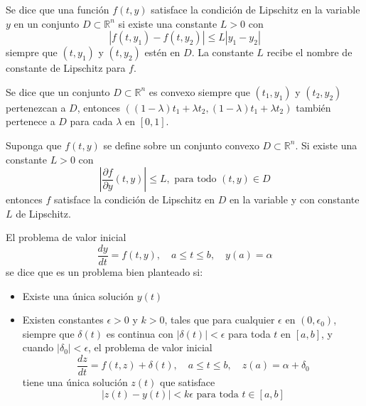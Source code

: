 \begin{definition}
    Se dice que una función $f(t,y)$  satisface la condición de Lipschitz en la variable $y$ en un conjunto $D \subset \mathbb{R}^n$ si existe una constante $L > 0$ con
    \[ |f(t, y_1) - f(t, y_2)| \leq L |y_1 - y_2| \]
    siempre que $(t, y_1)$ y $(t, y_2)$ estén en $D$. La constante $L$ recibe el nombre de constante de Lipschitz para $f$.
\end{definition}

\begin{definition}
    Se dice que un conjunto $D \subset \mathbb{R}^n$ es convexo siempre que $(t_1, y_1)$ y $(t_2, y_2)$ pertenezcan a $D$, entonces $((1 - \lambda)t_1 + \lambda t_2, (1 - \lambda)t_1 + \lambda t_2)$ también pertenece a $D$ para cada $\lambda$ en $[0,1]$.
\end{definition}

\begin{theorem}
    Suponga que $f(t, y)$ se define sobre un conjunto convexo $D \subset \mathbb{R}^n$. Si existe una constante $L > 0$ con
    \begin{equation}
        \left| \frac{\partial f}{\partial y} (t,y) \right| \leq L, \text{ para todo } (t, y) \in D
    \end{equation}
    entonces $f$ satisface la condición de Lipschitz en $D$ en la variable y con constante $L$ de Lipschitz.
\end{theorem}

\begin{definition}
    El problema de valor inicial
    \begin{equation}
        \label{eq: PVI Original}
        \frac{dy}{dt} = f(t, y), \quad a \leq t \leq b, \quad y(a) = \alpha
    \end{equation}
    se dice que es un problema bien planteado si:
    \begin{itemize}
        \item Existe una única solución $y(t)$
        \item Existen constantes $\epsilon > 0$ y $k > 0$, tales que para cualquier $\epsilon$ en $(0, \epsilon_0)$, siempre que $\delta(t)$ es continua con $|\delta (t)| < \epsilon$ para toda $t$ en $[a, b]$, y cuando $|\delta_0| < \epsilon $, el problema de valor inicial
        \begin{equation}
            \label{eq: PVI Perturbado}
            \frac{dz}{dt} = f(t, z) + \delta (t), \quad a \leq t \leq b, \quad z(a) = \alpha + \delta_0
        \end{equation}
        tiene una única solución $z(t)$ que satisface
        \[ |z(t) - y(t)| < k \epsilon \text{ para toda } t \in [a, b]\]
    \end{itemize}
\end{definition}

